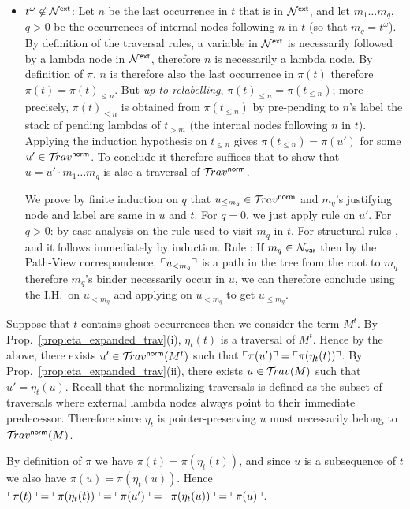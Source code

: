 \documentclass{article}
\theoremstyle{definition}
\newcommand\Nodes{\mathcal{N}}%
\newcommand\NodesVar{\Nodes_{\sf var}}%
\newcommand{\normalizing}{{\sf norm}}
\newcommand{\travsetnorm}{\travset^\normalizing}
\newcommand{\travulc}{\travset}
\def\coresymbol{\pi} %
\newcommand{\core}[1]{\coresymbol(#1)} %
\newcommand{\ExtNodes}{\Nodes^{\sf ext}}
\begin{document}
\begin{itemize}
\item $t^\omega\not\in \ExtNodes$: Let $n$ be the last occurrence in $t$ that is in $\ExtNodes$, and let $m_1 \ldots m_q$, $q>0$ be the occurrences of internal nodes following $n$ in $t$ (so that $m_q = t^\omega$). By definition of the traversal rules, a variable in $\ExtNodes$ is necessarily followed by a lambda node in $\ExtNodes$, therefore $n$ is necessarily a lambda node. By definition of $\coresymbol$, $n$ is therefore also the last occurrence in $\core{t}$ therefore $\core{t} = \core{t}_{\leq n}$.
But \emph{up to relabelling}, $\core{t}_{\leq n} = \core{t_{\leq n}}$; more precisely, $\core{t}_{\leq n}$ is obtained from $\core{t_{\leq n}}$
by pre-pending to $n$'s label the stack of pending lambdas of $t_{>m}$ (the internal nodes following $n$ in $t$). Applying the induction hypothesis on $t_{\leq n}$ gives $\core{t_{\leq n}} = \core{u'}$ for some $u' \in \travsetnorm$.
To conclude it therefore suffices that to show that $u = u' \cdot m_1 \ldots m_q$ is also a traversal of $\travsetnorm$.

We prove by finite induction on $q$ that $u_{\leq m_q} \in\travsetnorm$ and $m_q$'s justifying node and label are same in $u$ and $t$. For $q=0$, we just apply rule  on $u'$.
For $q>0$: by case analysis on the rule used to visit $m_q$ in $t$.
For structural rules ,  and  it follows immediately by induction.
Rule : If $m_q \in \NodesVar$ then by the Path-View correspondence, $\ulcorner u_{<m_q} \urcorner$ is a path in the tree from the root to $m_q$ therefore $m_q$'s binder necessarily occur in $u$, we can therefore conclude using the I.H.~on $u_{<m_q}$ and applying  on $u_{<m_q}$ to get $u_{\leq m_q}$.
\end{itemize}
Suppose that $t$ contains ghost occurrences then we consider the term $M^t$.
By Prop.~\ref{prop:eta_expanded_trav}(i), $\eta_t(t)$ is a traversal of $M^t$. Hence by the above, there exists $u'\in\travsetnorm(M^t)$ such that
$\pview{\core{u'}}=\pview{\core{\eta_t(t)}}$.
By Prop.~\ref{prop:eta_expanded_trav}(ii),
there exists $u \in \travulc(M)$ such that
$u' = \eta_t(u)$. Recall that the normalizing traversals is defined as the subset of traversals where external lambda nodes always point to their immediate predecessor. Therefore since $\eta_t$ is pointer-preserving $u$ must necessarily belong to $\travsetnorm(M)$.

By definition of $\coresymbol$ we have $\core{t} = \core{\eta_t(t)}$, and since $u$ is a subsequence of $t$ we also have $\core{u} = \core{\eta_t(u)}$.
Hence $\pview{\core{t}}=\pview{\core{\eta_t(t)}}=
\pview{\core{u'}} = \pview{\core{\eta_t(u)}} = \pview{\core{u}}$.
\endproofatend
\end{document}

